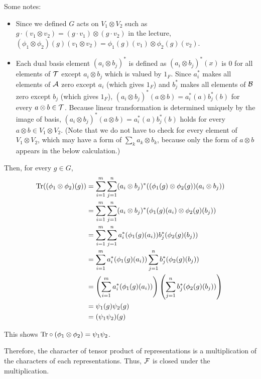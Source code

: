 Some notes:
\begin{itemize}
\item Since we defined \(G\) acts on \(V_1 \otimes V_2\) such as
  \(g \cdot (v_1 \otimes v_2) = (g \cdot v_1) \otimes (g \cdot v_2)\)
  in the lecture,
  \((\phi_1 \otimes \phi_2)(g)(v_1 \otimes v_2) = \phi_1(g)(v_1) \otimes \phi_2(g)(v_2)\).
\item Each dual basis element \((a_i \otimes b_j)^*\) is defined as
  \((a_i \otimes b_j)^*(x)\) is 0 for all elements of \(\mathcal{T}\)
  except \(a_i \otimes b_j\) which is valued by \(1_F\).
  Since \(a_i^*\) makes all elements of \(\mathcal{A}\) zero except \(a_i\) (which gives \(1_F\))
  and \(b_j^*\) makes all elements of \(\mathcal{B}\) zero except \(b_j\) (which gives \(1_F\)),
  \((a_i \otimes b_j)^*(a \otimes b) = a_i^*(a) b_j^*(b)\)
  for every \(a \otimes b \in \mathcal{T}\).
  Because linear transformation is determined uniquely by the image of basis,
  \((a_i \otimes b_j)^*(a \otimes b) = a_i^*(a) b_j^*(b)\) holds for every \(a \otimes b \in V_1 \otimes V_2\).
  (Note that we do not have to check for every element of \(V_1 \otimes V_2\),
  which may have a form of \(\sum_k a_k \otimes b_k\),
  because only the form of \(a \otimes b\) appears in the below calculation.)
\end{itemize}
Then, for every \(g \in G\),
\begin{align*}
  \textnormal{Tr}((\phi_1 \otimes \phi_2)(g))
  &= \sum_{i=1}^m \sum_{j=1}^n
    (a_i \otimes b_j)^*((\phi_1(g) \otimes \phi_2(g))(a_i \otimes b_j))
  \\&= \sum_{i=1}^m \sum_{j=1}^n
    (a_i \otimes b_j)^*(\phi_1(g)(a_i) \otimes \phi_2(g)(b_j))
  \\&= \sum_{i=1}^m \sum_{j=1}^n
    a_i^*(\phi_1(g)(a_i)) b_j^*(\phi_2(g)(b_j))
  \\&= \sum_{i=1}^m a_i^*(\phi_1(g)(a_i))
    \sum_{j=1}^n b_j^*(\phi_2(g)(b_j))
  \\&= \left( \sum_{i=1}^m a_i^*(\phi_1(g)(a_i)) \right)
    \left( \sum_{j=1}^n b_j^*(\phi_2(g)(b_j)) \right)
  \\&= \psi_1(g) \psi_2(g)
  \\&= (\psi_1\psi_2)(g)
\end{align*}

This shows \(\textnormal{Tr} \circ (\phi_1 \otimes \phi_2) = \psi_1 \psi_2\).

Therefore, the character of tensor product of representations
is a multiplication of the characters of each representations.
Thus, \(\mathcal{F}\) is closed under the multiplication.
\qedsq
